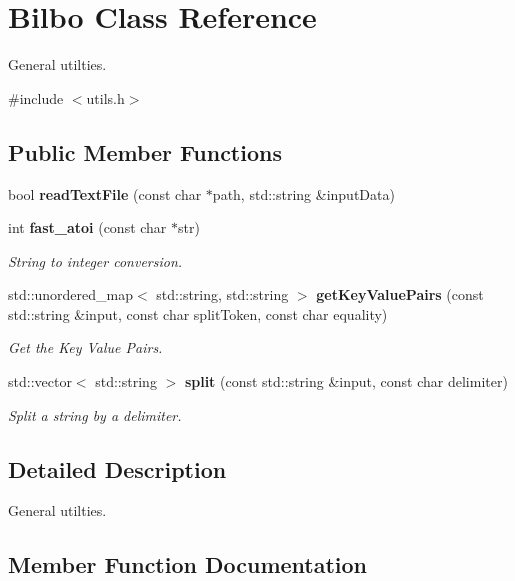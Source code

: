 \section{Bilbo Class Reference}
\label{class_bilbo}


General utilties.  




{\ttfamily \#include $<$utils.\+h$>$}

\subsection*{Public Member Functions}
\begin{DoxyCompactItemize}
\item 
bool \textbf{ read\+Text\+File} (const char $\ast$path, std\+::string \&input\+Data)
\item 
int \textbf{ fast\+\_\+atoi} (const char $\ast$str)
\begin{DoxyCompactList}\small\item\em String to integer conversion. \end{DoxyCompactList}\item 
std\+::unordered\+\_\+map$<$ std\+::string, std\+::string $>$ \textbf{ get\+Key\+Value\+Pairs} (const std\+::string \&input, const char split\+Token, const char equality)
\begin{DoxyCompactList}\small\item\em Get the Key Value Pairs. \end{DoxyCompactList}\item 
std\+::vector$<$ std\+::string $>$ \textbf{ split} (const std\+::string \&input, const char delimiter)
\begin{DoxyCompactList}\small\item\em Split a string by a delimiter. \end{DoxyCompactList}\end{DoxyCompactItemize}


\subsection{Detailed Description}
General utilties. 

\subsection{Member Function Documentation}
\mbox{\label{class_bilbo_a4c567f47e8f57e753b18b5ed8fcdba8b}} 
